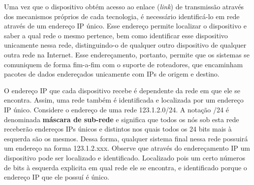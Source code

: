 \documentclass[	12pt, Times, openright, twoside, a4paper, english, brazil]{abntex2}
\begin{document}
Uma vez que o dispositivo obtém acesso ao enlace (\textit{link}) de transmissão através dos mecanismos próprios de cada tecnologia, é necessário identificá-lo em rede através de um endereço IP único. Esse endereço permite localizar o dispositivo e saber a qual rede o mesmo pertence, bem como identificar esse dispositivo unicamente nessa rede, distinguindo-o de qualquer outro dispositivo de qualquer outra rede na Internet. Esse endereçamento, portanto, permite que os sistemas se comuniquem de forma fim-a-fim com o suporte de roteadores, que encaminham pacotes de dados endereçados unicamente com IPs de origem e destino. 

O endereço IP que cada dispositivo recebe é dependente da rede em que ele se encontra. Assim, uma rede também é identificada e localizada por um endereço IP único. Considere o endereço de uma rede 123.1.2.0/24. A notação /24 é denominada \textbf{máscara de sub-rede} e significa que todos os nós sob esta rede receberão endereços IPs únicos e distintos nos quais todos os 24 bits mais à esquerda são os mesmos. Dessa forma, qualquer sistema final nessa rede possuirá um endereço na forma 123.1.2.xxx. Observe que através do endereçamento IP um dispositivo pode ser localizado e identificado. Localizado pois um certo números de bits à esquerda explicita em qual rede ele se encontra, e identificado porque o endereço IP que ele possuí é único.


\end{document}
